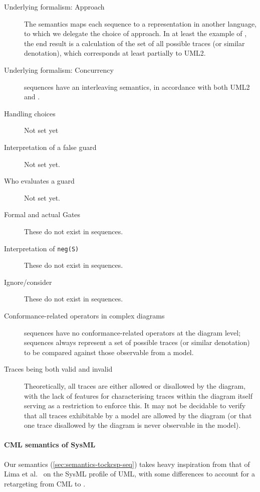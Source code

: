 \begin{description}
\item[Underlying formalism: Approach]
  The \langname{} semantics maps each sequence to a representation in another
  language, to which we delegate the choice of approach.
  In at least the example of \tockcsp, the end result is a calculation of the
  set of all possible traces (or similar denotation), which corresponds at
  least partially to UML2.
\item[Underlying formalism: Concurrency]
  \langname{} sequences have an interleaving semantics, in accordance with
  both UML2 and \tockcsp.
\item[Handling choices]
  Not set yet
\item[Interpretation of a false guard]
  Not set yet.
\item[Who evaluates a guard]
  Not set yet.
\item[Formal and actual Gates]
  These do not exist in \langname{} sequences.
\item[Interpretation of \texttt{neg(S)}]
  These do not exist in \langname{} sequences.
\item[Ignore/consider]
  These do not exist in \langname{} sequences.
\item[Conformance-related operators in complex diagrams]
  \langname{} sequences have no conformance-related operators at the diagram
  level; sequences always represent a set of possible traces (or similar
  denotation) to be compared against those observable from a model.
\item[Traces being both valid and invalid]
  Theoretically, all traces are either allowed or disallowed by the diagram,
  with the lack of features for characterising traces within the diagram itself
  serving as a restriction to enforce this.  It may not
  be decidable to verify that all traces exhibitable by a model are allowed by
  the diagram (or that one trace disallowed by the diagram is never observable
  in the model).
\end{description}

\paragraph{CML semantics of SysML}

Our semantics (\cref{sec:semantics-tockcsp-seq}) takes heavy inspiration from
that of Lima et al.~\cite{lima-semantics} on the SysML profile of UML, with
some differences to account for a retargeting from CML to \tockcsp.

